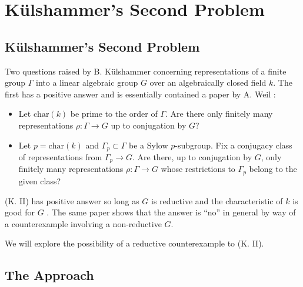 
\chapter{K\"ulshammer's Second Problem}
\label{Chapter4}


\section{K\"ulshammer's Second Problem}

Two questions raised by B. K\"ulshammer concerning representations of a finite group $\Gamma$ into a linear algebraic group $G$ over an algebraically closed field $k$. The first has a positive answer  and is essentially contained a paper by A. Weil \cite{weil1964remarks}:
\begin{itemize}
	\item[(K. I)] Let $\mathrm{char}(k)$ be prime to the order of $\Gamma$. Are there only finitely many representations $\rho:\Gamma\rightarrow G$ up to conjugation by $G$?
	\item[(K. II)] Let $p = \mathrm{char}(k)$ and $\Gamma_p \subset  \Gamma$ be a Sylow $p$-subgroup. Fix a conjugacy class of representations from $\Gamma_p\rightarrow G$. Are there, up to conjugation by $G$, only finitely many representations $\rho:\Gamma\rightarrow G$ whose restrictions to $\Gamma_p$ belong to the given class?
\end{itemize}

(K. II) has positive answer so long as $G$ is reductive and the characteristic of $k$ is good for $G$ \cite{slodowy1997two}. The same paper shows that the answer is ``no'' in general by way of a counterexample involving a non-reductive $G$.

We will explore the possibility of a reductive counterexample to (K. II).

\section{The Approach}

